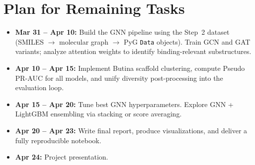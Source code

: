 \documentclass[11pt, letterpaper]{article}
\begin{document}
\section*{Plan for Remaining Tasks}

\begin{itemize}[leftmargin=1.5em, itemsep=4pt, topsep=2pt]
    \item \textbf{Mar 31 -- Apr 10:} Build the GNN pipeline using the Step~2 dataset (SMILES $\rightarrow$ molecular graph $\rightarrow$ PyG \texttt{Data} objects). Train GCN and GAT variants; analyze attention weights to identify binding-relevant substructures.
    \item \textbf{Apr 10 -- Apr 15:} Implement Butina scaffold clustering, compute Pseudo PR-AUC for all models, and unify diversity post-processing into the evaluation loop.
    \item \textbf{Apr 15 -- Apr 20:} Tune best GNN hyperparameters. Explore GNN + LightGBM ensembling via stacking or score averaging.
    \item \textbf{Apr 20 -- Apr 23:} Write final report, produce visualizations, and deliver a fully reproducible notebook.
    \item \textbf{Apr 24:} Project presentation.
\end{itemize}
\end{document}
